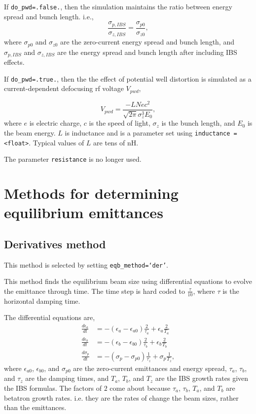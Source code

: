 \documentclass[11pt]{article}
\begin{document}
If {\tt do_pwd=.false.}, then the simulation maintains the ratio between energy spread and bunch length.
i.e.,
\begin{equation}
\frac{\sigma_{p,IBS}}{\sigma_{z,IBS}}=\frac{\sigma_{p0}}{\sigma_{z0}},
\end{equation}
where $\sigma_{p0}$ and $\sigma_{z0}$ are the zero-current energy spread and bunch length,
and $\sigma_{p,IBS}$ and $\sigma_{z,IBS}$ are the energy spread and bunch length after
including IBS effects.

If {\tt do_pwd=.true.}, then the the effect of potential well distortion is simulated as a 
current-dependent defocusing rf voltage $V_{pwd}$,

\begin{equation}
V_{pwd}=\frac{-L N e c^2}{\sqrt{2\pi}\sigma_z^3 E_0},
\end{equation}
where $e$ is electric charge, $c$ is the speed of light,
$\sigma_z$ is the bunch length, and $E_0$ is the beam energy.
$L$ is inductance and is a parameter set using {\tt inductance = <float>}.
Typical values of $L$ are tens of nH.

The parameter {\tt resistance} is no longer used.

\section{Methods for determining equilibrium emittances}

\subsection{Derivatives method}
This method is selected by setting {\tt eqb_method=`der'}.

This method finds the equilibrium beam size using differential equations to 
evolve the emittance through time.  The time step is hard coded to $\frac{\tau}{10}$,
where $\tau$ is the horizontal damping time.

The differential equations are,
\begin{align}
\frac{d\epsilon_a}{dt}&= -\left(\epsilon_a-\epsilon_{a0}\right)\frac{2}{\tau_a}+\epsilon_a\frac{2}{T_a}\label{e:da}\\
\frac{d\epsilon_b}{dt}&= -\left(\epsilon_b-\epsilon_{b0}\right)\frac{2}{\tau_b}+\epsilon_b\frac{2}{T_b}\label{e:db}\\
\frac{d \sigma_p}{dt}&= -\left(\sigma_p-\sigma_{p0}\right)\frac{1}{\tau_z}+\sigma_p\frac{1}{T_z}\label{e:dp},
\end{align}
where $\epsilon_{a0}$, $\epsilon_{b0}$, and $\sigma_{p0}$ are the zero-current emittances and energy spread,
$\tau_a$, $\tau_b$, and $\tau_z$ are the damping times, and $T_a$, $T_b$, and $T_z$ are the IBS
growth rates given the IBS formulas.  The factors of $2$ come about because $\tau_a$, $\tau_b$,
$T_a$, and $T_b$ are betatron growth rates.  i.e.  they are the rates of change the beam sizes,
rather than the emittances.
\end{document}
